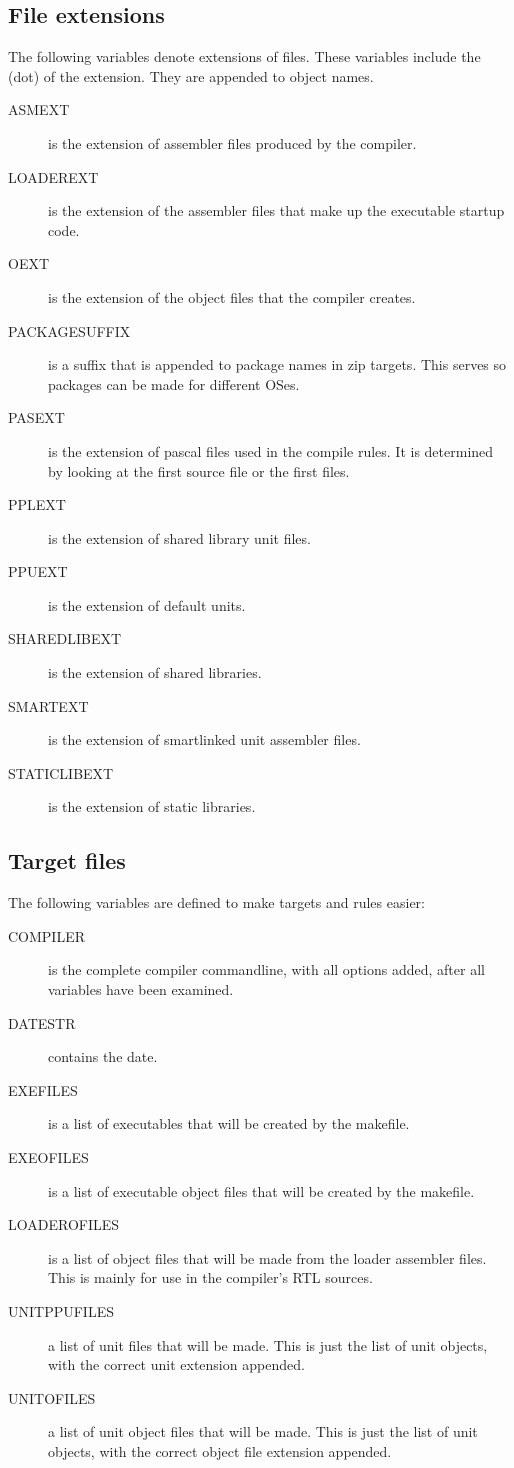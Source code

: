 \subsection{File extensions}

The following variables denote extensions of files. These variables include
the  (dot) of the extension. They are appended to object names.

\begin{description}
\item[ASMEXT] is the extension of assembler files produced by the compiler.
\item[LOADEREXT] is the extension of the assembler files that make up the
executable startup code.
\item[OEXT] is the extension of the  object files that the compiler creates.
\item[PACKAGESUFFIX] is a suffix that is appended to package names in zip
targets. This serves so packages can be made for different OSes.
\item[PASEXT] is the extension of pascal files used in the compile rules.
It is determined by looking at the first  source file or
the first  files.
\item[PPLEXT] is the extension of shared library unit files.
\item[PPUEXT] is the extension of default units.
\item[SHAREDLIBEXT] is the extension of shared libraries.
\item[SMARTEXT] is the extension of smartlinked unit assembler files.
\item[STATICLIBEXT] is the extension of static libraries.
\end{description}

\subsection{Target files}

The following variables are defined to make targets and rules easier:
\begin{description}
\item[COMPILER] is the complete compiler commandline, with all options
added, after all  variables have been examined.
\item[DATESTR] contains the date.
\item[EXEFILES] is a list of executables that will be created by the
makefile.
\item[EXEOFILES] is a list of executable object files that will be created
by the makefile.
\item[LOADEROFILES] is a list of object files that will be made from the
loader assembler files. This is mainly for use in the compiler's RTL sources.
\item[UNITPPUFILES] a list of unit files that will be made. This is just
the list of unit objects, with the correct unit extension appended.
\item[UNITOFILES] a list of unit object files that will be made.
This is just the list of unit objects, with the correct object file
extension appended.
\end{description}

